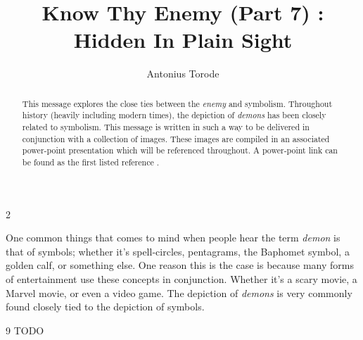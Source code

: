 \documentclass[10pt]{article}
\title{Know Thy Enemy (Part 7) 	: Hidden In Plain Sight}
\author{Antonius Torode}
\begin{document}
\maketitle
\thispagestyle{fancy}


\begin{abstract}
This message explores the close ties between the \textit{enemy} and symbolism. Throughout history (heavily including modern times), the depiction of \textit{demons} has been closely related to symbolism. This message is written in such a way to be delivered in conjunction with a collection of images. These images are compiled in an associated power-point presentation which will be referenced throughout. A power-point link can be found as the first listed reference \cite{ppt}.
\end{abstract}

\begin{multicols}{2}

One common things that comes to mind when people hear the term \textit{demon} is that of symbols; whether it's spell-circles, pentagrams, the Baphomet symbol, a golden calf, or something else. One reason this is the case is because many forms of entertainment use these concepts in conjunction. Whether it's a scary movie, a Marvel movie, or even a video game. The depiction of \textit{demons} is very commonly found closely tied to the depiction of symbols. 

\begin{thebibliography}{9}
{\footnotesize
	 TODO
}
\end{thebibliography}

\end{multicols}


\end{document}
